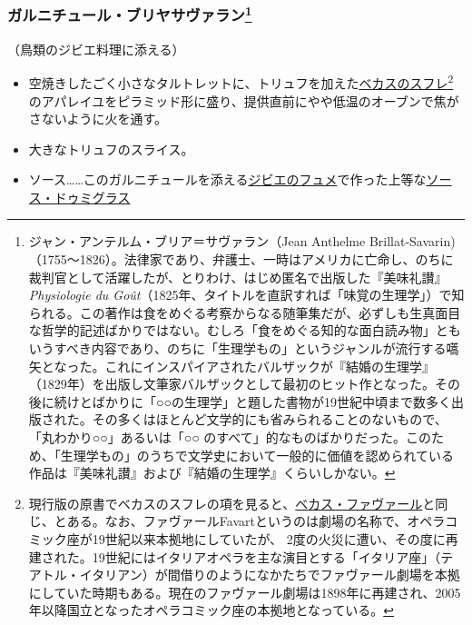 \begin{recette}
{\subsubsection[ガルニチュール・ブリヤサヴァラン]{\texorpdfstring{ガルニチュール・ブリヤサヴァラン\footnote{ジャン・アンテルム・ブリア＝サヴァラン（Jean
  Anthelme
  Brillat-Savarin)（1755〜1826）。法律家であり、弁護士、一時はアメリカに亡命し、のちに裁判官として活躍したが、とりわけ、はじめ匿名で出版した『美味礼讃』\emph{Physiologie
  du
  Goût}（1825年、タイトルを直訳すれば「味覚の生理学」）で知られる。この著作は食をめぐる考察からなる随筆集だが、必ずしも生真面目な哲学的記述ばかりではない。むしろ「食をめぐる知的な面白読み物」ともいうすべき内容であり、のちに「生理学もの」というジャンルが流行する嚆矢となった。これにインスパイアされたバルザックが『結婚の生理学』（1829年）を出版し文筆家バルザックとして最初のヒット作となった。その後に続けとばかりに「○○の生理学」と題した書物が19世紀中頃まで数多く出版された。その多くはほとんど文学的にも省みられることのないもので、「丸わかり○○」あるいは「○○
  のすべて」的なものばかりだった。このため、「生理学もの」のうちで文学史において一般的に価値を認められている作品は『美味礼讃』および『結婚の生理学』くらいしかない。}}{ガルニチュール・ブリヤサヴァラン}}\label{garniture-brillat-savarin}}



（鳥類のジビエ料理に添える）

\begin{itemize}
\item
  空焼きしたごく小さなタルトレットに、トリュフを加えた\protect\hyperlink{souffle-de-becasse}{ベカスのスフレ}\footnote{現行版の原書でベカスのスフレの項を見ると、\protect\hyperlink{becasse-favart}{ベカス・ファヴァール}と同じ、とある。なお、ファヴァールFavartというのは劇場の名称で、オペラコミック座が19世紀以来本拠地にしていたが、
    2度の火災に遭い、その度に再建された。19世紀にはイタリアオペラを主な演目とする「イタリア座」（テアトル・イタリアン）が間借りのようになかたちでファヴァール劇場を本拠にしていた時期もある。現在のファヴァール劇場は1898年に再建され、2005年以降国立となったオペラコミック座の本拠地となっている。}のアパレイユをピラミッド形に盛り、提供直前にやや低温のオーブンで焦がさないように火を通す。
\item
  大きなトリュフのスライス。
\item
  ソース\ldots{}\ldots{}このガルニチュールを添える\protect\hyperlink{fonds-de-gibier}{ジビエのフュメ}で作った上等な\protect\hyperlink{sauce-demi-glace}{ソース・ドゥミグラス}
\end{itemize}


\end{recette}
